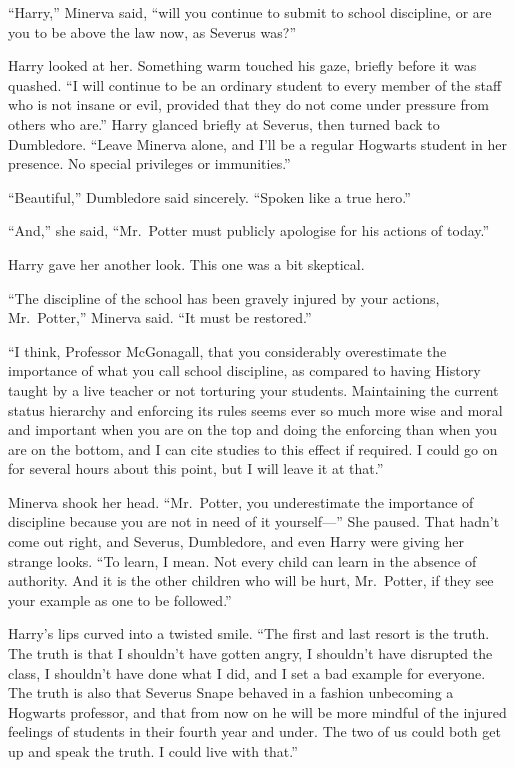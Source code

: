``Harry,'' Minerva said, ``will you continue to submit to school
discipline, or are you to be above the law now, as Severus was?''

Harry looked at her. Something warm touched his gaze, briefly before it
was quashed. ``I will continue to be an ordinary student to every member
of the staff who is not insane or evil, provided that they do not come
under pressure from others who are.'' Harry glanced briefly at Severus,
then turned back to Dumbledore. ``Leave Minerva alone, and I'll be a
regular Hogwarts student in her presence. No special privileges or
immunities.''

``Beautiful,'' Dumbledore said sincerely. ``Spoken like a true hero.''

``And,'' she said, ``Mr.~Potter must publicly apologise for his actions
of today.''

Harry gave her another look. This one was a bit skeptical.

``The discipline of the school has been gravely injured by your actions,
Mr.~Potter,'' Minerva said. ``It must be restored.''

``I think, Professor McGonagall, that you considerably overestimate the
importance of what you call school discipline, as compared to having
History taught by a live teacher or not torturing your students.
Maintaining the current status hierarchy and enforcing its rules seems
ever so much more wise and moral and important when you are on the top
and doing the enforcing than when you are on the bottom, and I can cite
studies to this effect if required. I could go on for several hours
about this point, but I will leave it at that.''

Minerva shook her head. ``Mr.~Potter, you underestimate the importance
of discipline because you are not in need of it yourself---'' She
paused. That hadn't come out right, and Severus, Dumbledore, and even
Harry were giving her strange looks. ``To learn, I mean. Not every child
can learn in the absence of authority. And it is the other children who
will be hurt, Mr.~Potter, if they see your example as one to be
followed.''

Harry's lips curved into a twisted smile. ``The first and last resort is
the truth. The truth is that I shouldn't have gotten angry, I shouldn't
have disrupted the class, I shouldn't have done what I did, and I set a
bad example for everyone. The truth is also that Severus Snape behaved
in a fashion unbecoming a Hogwarts professor, and that from now on he
will be more mindful of the injured feelings of students in their fourth
year and under. The two of us could both get up and speak the truth. I
could live with that.''

